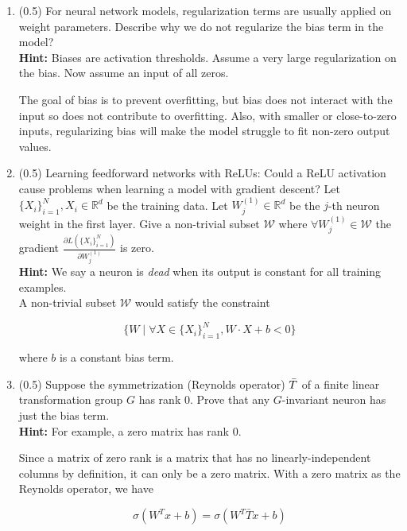 \documentclass{article}
\begin{document}
\begin{enumerate}


\item (0.5) For neural network models, regularization terms are usually applied on weight parameters. Describe why we do not regularize the bias term in the model? \\
{\bf Hint:} Biases are activation thresholds. Assume a very large regularization on the bias. Now assume an input of all zeros.

The goal of bias is to prevent overfitting, but bias does not interact with the
input so does not contribute to overfitting. Also, with smaller or close-to-zero
inputs, regularizing bias will make the model struggle to fit non-zero output
values.

\vspace{3in}

\item (0.5)  Learning feedforward networks with ReLUs: Could a ReLU activation cause problems when learning a model with gradient descent? Let $\{X_i\}_{i=1}^N,X_i\in \mathbb{R}^d$ be the training data. Let $W_j^{(1)}\in \mathbb{R}^d$ be the $j$-th neuron weight in the first layer. Give a non-trivial subset $\mathcal{W}$ where $\forall W_j^{(1)}\in \mathcal{W}$ the gradient $\frac{\partial L(\{X_i\}_{i=1}^N)}{\partial W_j^{(1)}}$ is zero. \\
{\bf Hint:} We say a neuron is {\em dead} when its output is constant for all training examples. \\

A non-trivial subset $\mathcal{W}$ would satisfy the constraint 

$$\{W \mid \forall X \in \{X_i\}_{i=1}^N , W \cdot X + b < 0 \}$$

where $b$ is a constant bias term.

\newpage

\item (0.5) 
Suppose the symmetrization (Reynolds operator) $\Bar{T}$ of a finite linear transformation group $G$ has rank $0$. Prove that any $G$-invariant neuron has just the bias term.\\
{\bf Hint:} For example, a zero matrix has rank $0$.

Since a matrix of zero rank is a matrix that has no linearly-independent columns by definition, it can only be a zero matrix. With a zero matrix as the Reynolds operator, we have

$$\sigma(W^T x + b) = \sigma(W^T \bar{T} x + b)$$


\end{enumerate}
\end{document}
